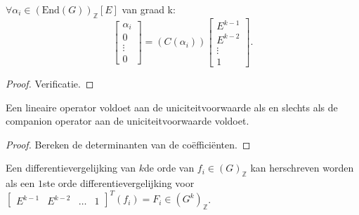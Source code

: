 \documentclass[a4paper,12pt]{article}
\begin{document}
\begin{theorem}
    \label{relatie companion operator}
    $\forall \alpha_i \in (\text{End}(G))_\mathbb{Z}[E]$ van graad k:
    $$
        \left[\begin{array}{c}
                \alpha_{i} \\
                0          \\
                \vdots     \\
                0
            \end{array}\right]
        =
        \left(
        C(\alpha_i) \right)
        \left[\begin{array}{c}
                E^{k-1} \\
                E^{k-2} \\
                \vdots  \\
                1
            \end{array}\right].
    $$
\end{theorem}
\begin{proof}
    Verificatie.
\end{proof}

\begin{lemma}
    \label{inverteerbare companion}
    Een lineaire operator voldoet aan de uniciteitvoorwaarde als en slechts
    als de companion operator aan de uniciteitvoorwaarde voldoet.
\end{lemma}
\begin{proof}
    Bereken de determinanten van de coëfficiënten.
\end{proof}



\begin{theorem}
    \label{compeq}
    Een differentievergelijking van $k$de orde  van $f_i \in (G)_{\mathbb{Z}}$ kan herschreven
    worden als een $1$ste orde differentievergelijking voor
    $\left[\begin{array}{cccc}
                E^{k-1} &
                E^{k-2} &
                \hdots  &
                1
            \end{array}\right]^T (f_i) = F_i\in (G^k)_{\mathbb{Z}}$.
\end{theorem}
\end{document}
